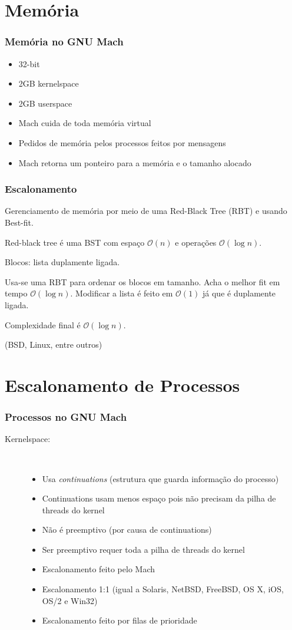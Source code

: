 \documentclass[10pt]{beamer}
\theoremstyle{plain}
\newcommand{\bigo}{\mathcal{O}}
\begin{document}
\section{Memória}

\begin{frame}
  \frametitle{Memória no GNU Mach}
  \begin{itemize}
    \item 32-bit
    \item 2GB kernelspace
    \item 2GB userspace
    \item Mach cuida de toda memória virtual
    \item Pedidos de memória pelos processos feitos por mensagens
    \item Mach retorna um ponteiro para a memória e o tamanho alocado
  \end{itemize}
\end{frame}

\begin{frame}
  \frametitle{Escalonamento}
  Gerenciamento de memória por meio de uma Red-Black Tree (RBT) e usando Best-fit.

  Red-black tree é uma BST com espaço $\bigo(n)$ e operações $\bigo(\log n)$.

  Blocos: lista duplamente ligada.

  Usa-se uma RBT para ordenar os blocos em tamanho. Acha o melhor fit em tempo $\bigo(\log n)$.
  Modificar a lista é feito em $\bigo(1)$ já que é duplamente ligada.

  Complexidade final é $\bigo(\log n)$.

  (BSD, Linux, entre outros)
\end{frame}

\section{Escalonamento de Processos}

\begin{frame}
  \frametitle{Processos no GNU Mach}
  \begin{description}
    \item[Kernelspace:]~\\
      \begin{itemize}
        \item Usa \textit{continuations} (estrutura que guarda informação do processo)
        \item Continuations usam menos espaço pois não precisam da pilha de threads do kernel
        \item Não é preemptivo (por causa de continuations)
        \item Ser preemptivo requer toda a pilha de threads do kernel
        \item Escalonamento feito pelo Mach
        \item Escalonamento 1:1 (igual a Solaris, NetBSD, FreeBSD, OS X, iOS, OS/2 e Win32)
        \item Escalonamento feito por filas de prioridade
      \end{itemize}
  \end{description}
\end{frame}
\end{document}
